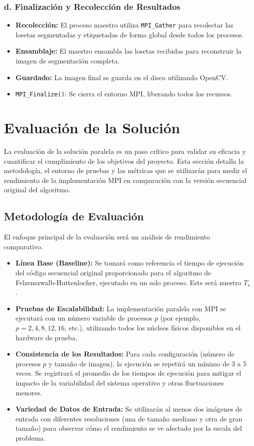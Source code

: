 \documentclass[fleqn,10pt]{article}
\begin{document}
\subsubsection*{d. Finalización y Recolección de Resultados}
\begin{itemize}
    \item \textbf{Recolección:} El proceso maestro utiliza \texttt{MPI\_Gather} para recolectar las losetas segmentadas y etiquetadas de forma global desde todos los procesos.
    \item \textbf{Ensamblaje:} El maestro ensambla las losetas recibidas para reconstruir la imagen de segmentación completa.
    \item \textbf{Guardado:} La imagen final se guarda en el disco utilizando OpenCV.
    \item \texttt{MPI\_Finalize()}: Se cierra el entorno MPI, liberando todos los recursos.
\end{itemize}

\clearpage
\section{Evaluación de la Solución}
La evaluación de la solución paralela es un paso crítico para validar su eficacia y cuantificar el cumplimiento de los objetivos del proyecto. Esta sección detalla la metodología, el entorno de pruebas y las métricas que se utilizarán para medir el rendimiento de la implementación MPI en comparación con la versión secuencial original del algoritmo.

\subsection{Metodología de Evaluación}
El enfoque principal de la evaluación será un análisis de rendimiento comparativo.

\begin{itemize}
    \item \textbf{Línea Base (Baseline):} Se tomará como referencia el tiempo de ejecución del código secuencial original proporcionado para el algoritmo de Felzenszwalb-Huttenlocher, ejecutado en un solo proceso. Este será nuestro $T_s$.
    \item \textbf{Pruebas de Escalabilidad:} La implementación paralela con MPI se ejecutará con un número variable de procesos $p$ (por ejemplo, $p=2,4,8,12,16$, etc.), utilizando todos los núcleos físicos disponibles en el hardware de prueba.
    \item \textbf{Consistencia de los Resultados:} Para cada configuración (número de procesos $p$ y tamaño de imagen), la ejecución se repetirá un mínimo de 3 a 5 veces. Se registrará el promedio de los tiempos de ejecución para mitigar el impacto de la variabilidad del sistema operativo y otras fluctuaciones menores.
    \item \textbf{Variedad de Datos de Entrada:} Se utilizarán al menos dos imágenes de entrada con diferentes resoluciones (una de tamaño mediano y otra de gran tamaño) para observar cómo el rendimiento se ve afectado por la escala del problema.
\end{itemize}
\end{document}
